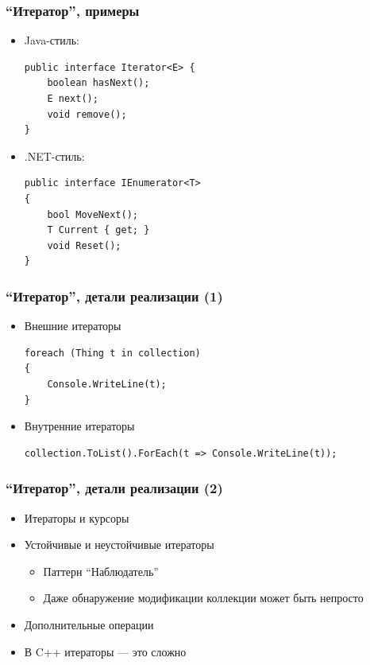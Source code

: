 \documentclass[xetex,mathserif,serif]{beamer}
\begin{document}
	\begin{frame}[fragile]
		\frametitle{``Итератор'', примеры}
		\begin{itemize}
			\item Java-стиль:
			\begin{verbatim}
public interface Iterator<E> {
    boolean hasNext();
    E next();
    void remove();
}
			\end{verbatim}
			\item .NET-стиль:
			\begin{verbatim}
public interface IEnumerator<T>
{
    bool MoveNext();
    T Current { get; }
    void Reset();
}
			\end{verbatim}
		\end{itemize}
	\end{frame}

	\begin{frame}[fragile]
		\frametitle{``Итератор'', детали реализации (1)}
		\begin{itemize}
			\item Внешние итераторы
			\begin{verbatim}
foreach (Thing t in collection)
{
    Console.WriteLine(t);
} 
			\end{verbatim}
			\item Внутренние итераторы
			\begin{verbatim}
collection.ToList().ForEach(t => Console.WriteLine(t));
			\end{verbatim}
		\end{itemize}
\end{frame}

	\begin{frame}
		\frametitle{``Итератор'', детали реализации (2)}
		\begin{itemize}
			\item Итераторы и курсоры
			\item Устойчивые и неустойчивые итераторы
			\begin{itemize}
				\item Паттерн ``Наблюдатель''
				\item Даже обнаружение модификации коллекции может быть непросто
			\end{itemize}
			\item Дополнительные операции
			\item В C++ итераторы --- это сложно
		\end{itemize}
	\end{frame}
\end{document}
